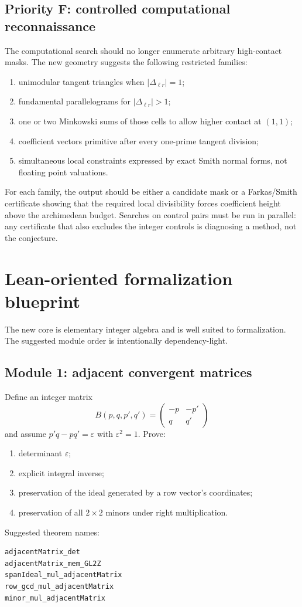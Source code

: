 \documentclass[11pt,oneside]{article}
\theoremstyle{definition}
\theoremstyle{remark}
\newcommand{\eps}{\varepsilon}
\begin{document}
\subsection{Priority F: controlled computational reconnaissance}

The computational search should no longer enumerate arbitrary high-contact masks.  The new
geometry suggests the following restricted families:
\begin{enumerate}
\item unimodular tangent triangles when $|\Delta_{\ell r}|=1$;
\item fundamental parallelograms for $|\Delta_{\ell r}|>1$;
\item one or two Minkowski sums of those cells to allow higher contact at $(1,1)$;
\item coefficient vectors primitive after every one-prime tangent division;
\item simultaneous local constraints expressed by exact Smith normal forms, not floating
point valuations.
\end{enumerate}

For each family, the output should be either a candidate mask or a Farkas/Smith certificate
showing that the required local divisibility forces coefficient height above the
archimedean budget.  Searches on control pairs must be run in parallel: any certificate that
also excludes the integer controls is diagnosing a method, not the conjecture.

\section{Lean-oriented formalization blueprint}
\label{sec:lean}

The new core is elementary integer algebra and is well suited to formalization.  The suggested
module order is intentionally dependency-light.

\subsection{Module 1: adjacent convergent matrices}

Define an integer matrix
\[
 B(p,q,p',q')=\begin{pmatrix}-p&-p'\\q&q'\end{pmatrix}
\]
and assume $p'q-pq'=\eps$ with $\eps^2=1$.  Prove:
\begin{enumerate}
\item determinant $\eps$;
\item explicit integral inverse;
\item preservation of the ideal generated by a row vector's coordinates;
\item preservation of all $2\times2$ minors under right multiplication.
\end{enumerate}
Suggested theorem names:
\begin{verbatim}
adjacentMatrix_det
adjacentMatrix_mem_GL2Z
spanIdeal_mul_adjacentMatrix
row_gcd_mul_adjacentMatrix
minor_mul_adjacentMatrix
\end{verbatim}
\end{document}
